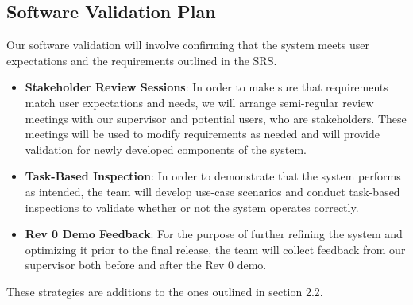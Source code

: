 \documentclass[12pt, titlepage]{article}
\begin{document}
\subsection{Software Validation Plan}






\noindent Our software validation will involve confirming that the system meets user expectations and the requirements outlined in the SRS.

\begin{itemize}
  \item \textbf{Stakeholder Review Sessions}: In order to make sure that requirements match user expectations and needs, we will arrange semi-regular review meetings with our supervisor and potential users, who are stakeholders. These meetings will be used to modify requirements as needed and will provide validation for newly developed components of the system.
  \item \textbf{Task-Based Inspection}: In order to demonstrate that the system performs as intended, the team will develop use-case scenarios and conduct task-based inspections to validate whether or not the system operates correctly.
  \item \textbf{Rev 0 Demo Feedback}: For the purpose of further refining the system and optimizing it prior to the final release, the team will collect feedback from our supervisor both before and after the Rev 0 demo. 
\end{itemize}

\noindent These strategies are additions to the ones outlined in section 2.2.
\end{document}
